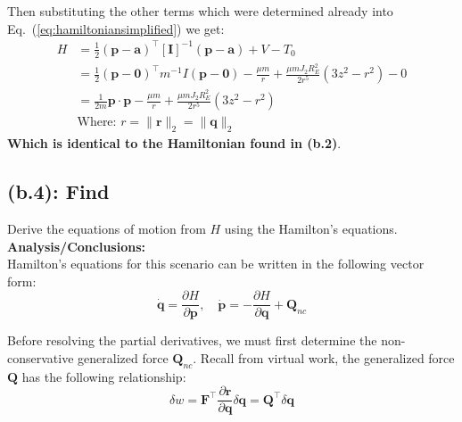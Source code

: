 \documentclass[titlepage]{article}
\begin{document}
\begin{mdframed}[linewidth=1pt, innertopmargin=10pt, innerbottommargin=10pt]
	Then substituting the other terms which were determined already into Eq.~(\ref{eq:hamiltoniansimplified}) we get:
	\begin{equation}
		\begin{split}
			H&=\frac{1}{2}(\boldsymbol{p}-\boldsymbol{a})^\top[\boldsymbol{I}]^{-1}(\boldsymbol{p}-\boldsymbol{a})+V-T_0 \\
			&=\frac{1}{2}(\boldsymbol{p}-\boldsymbol{0})^\top m^{-1}I(\boldsymbol{p}-\boldsymbol{0})-\frac{\mu m}{r}+\frac{\mu mJ_2R_E^2}{2r^5}\left(3z^2-r^2\right)-0 \\
			&=\frac{1}{2m}\boldsymbol{p}\cdot\boldsymbol{p}-\frac{\mu m}{r}+\frac{\mu mJ_2R_E^2}{2r^5}\left(3z^2-r^2\right) \\
			&\text{Where: }r=\|\boldsymbol{r}\|_2=\|\boldsymbol{q}\|_2
		\end{split}
	\end{equation}
	\textbf{Which is identical to the Hamiltonian found in (b.2)}.
\end{mdframed}

\subsection*{(b.4): Find}

Derive the equations of motion from $H$ using the Hamilton's equations. \\

\textbf{Analysis/Conclusions:}\\

Hamilton's equations for this scenario can be written in the following vector form:
\begin{equation}
	\dot{\boldsymbol{q}}=\frac{\partial H}{\partial\boldsymbol{p}},\quad\dot{\boldsymbol{p}}=-\frac{\partial H}{\partial\boldsymbol{q}}+\boldsymbol{Q}_{nc}
\end{equation}

Before resolving the partial derivatives, we must first determine the non-conservative generalized force $\boldsymbol{Q}_{nc}$. Recall from virtual work, the generalized force $\boldsymbol{Q}$ has the following relationship:
\begin{equation}
	\delta w=\boldsymbol{F}^\top\frac{\partial\boldsymbol{r}}{\partial\boldsymbol{q}}\delta\boldsymbol{q}=\boldsymbol{Q}^\top\delta\boldsymbol{q}
\end{equation}
\end{document}
